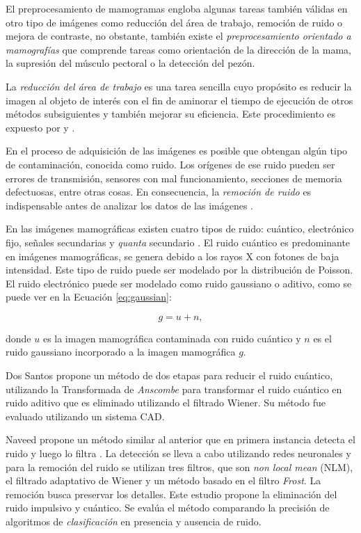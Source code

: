 El preprocesamiento de mamogramas engloba algunas tareas también válidas en
otro tipo de imágenes como reducción del área de trabajo, remoción de ruido o
mejora de contraste, no obstante, también existe el \textit{preprocesamiento
orientado a mamografías} que comprende tareas como orientación de la dirección
de la mama, la supresión del músculo pectoral o la detección del pezón.

La \textit{reducción del área de trabajo} es una tarea sencilla cuyo propósito
es reducir la imagen al objeto de interés con el fin de aminorar el tiempo de
ejecución de otros métodos subsiguientes y también mejorar su eficiencia. Este
procedimiento es expuesto por \cite{holguinpre} y \cite{dehghani2011method}.

En el proceso de adquisición de las imágenes es posible que obtengan algún tipo
de contaminación, conocida como ruido. Los orígenes de ese ruido pueden ser
errores de transmisión, sensores con mal funcionamiento, secciones de memoria
defectuosas, entre otras cosas. En consecuencia, la \textit{remoción de ruido}
es indispensable antes de analizar los datos de las imágenes
\cite{motwani2004survey}.

En las imágenes mamográficas existen cuatro tipos de ruido: cuántico,
electrónico fijo, señales secundarias y \textit{quanta} secundario
\cite{hashimoto2008practical}. El ruido cuántico es predominante en imágenes
mamográficas, se genera debido a los rayos X con fotones de baja intensidad.
Este tipo de ruido puede ser modelado por la distribución de Poisson. El ruido
electrónico puede ser modelado como ruido gaussiano o aditivo, como se puede
ver en la Ecuación \ref{eq:gaussian}:

\begin{equation}
\label{eq:gaussian}
            g = u + n,
\end{equation}

\noindent donde $u$ es la imagen mamográfica contaminada con ruido cuántico y
$n$ es el ruido gaussiano incorporado a la imagen mamográfica $g$.

Dos Santos \cite{dos2009mammography} propone un método de dos etapas para
reducir el ruido cuántico, utilizando la Transformada de \textit{Anscombe} para
transformar el ruido cuántico en ruido aditivo que es eliminado utilizando el
filtrado Wiener. Su método fue evaluado utilizando un sistema CAD. 

Naveed propone un método similar al anterior que en primera instancia detecta
el ruido y luego lo filtra \cite{naveed2012quantum}. La detección se lleva a
cabo utilizando redes neuronales y para la remoción del ruido se utilizan tres
filtros, que son \textit{non local mean} (NLM), el filtrado adaptativo de Wiener
y un método basado en el filtro \textit{Frost}. La remoción busca preservar los
detalles. Este estudio propone la eliminación del ruido impulsivo y cuántico.
Se evalúa el método comparando la precisión de algoritmos de
\textit{clasificación} en presencia y ausencia de ruido.

